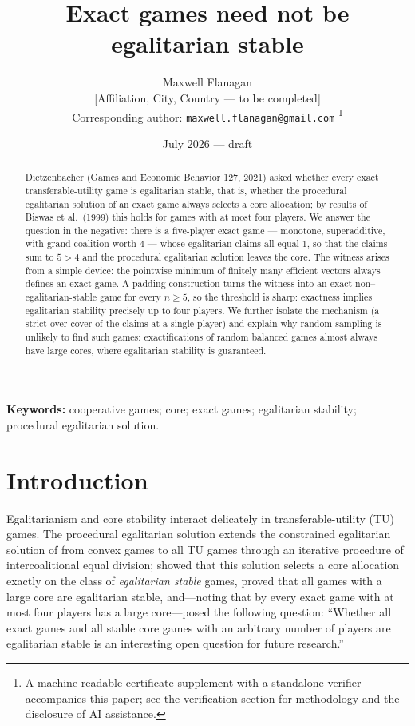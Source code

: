 \documentclass[11pt]{article}
\title{Exact games need not be egalitarian stable}
\author{Maxwell Flanagan\\[2pt]
\normalsize [Affiliation, City, Country --- to be completed]\\
\normalsize Corresponding author: \texttt{maxwell.flanagan@gmail.com}%
\thanks{A machine-readable certificate supplement with a standalone verifier
accompanies this paper; see the verification section for methodology and the
disclosure of AI assistance.}}
\date{July 2026 --- draft}
\begin{document}
\maketitle

\begin{abstract}
Dietzenbacher (Games and Economic Behavior 127, 2021) asked whether every
exact transferable-utility game is egalitarian stable, that is, whether the
procedural egalitarian solution of an exact game always selects a core
allocation; by results of Biswas et al.\ (1999) this holds for games with at
most four players. We answer the question in the negative: there is a
five-player exact game --- monotone, superadditive, with grand-coalition
worth $4$ --- whose egalitarian claims all equal $1$, so that the claims sum
to $5>4$ and the procedural egalitarian solution leaves the core. The
witness arises from a simple device: the pointwise minimum of finitely many
efficient vectors always defines an exact game. A padding construction turns
the witness into an exact non--egalitarian-stable game for every $n\ge 5$,
so the threshold is sharp: exactness implies egalitarian stability precisely
up to four players. We further isolate the mechanism (a strict over-cover of
the claims at a single player) and explain why random sampling is unlikely
to find such games: exactifications of random balanced games almost always
have large cores, where egalitarian stability is guaranteed.
\end{abstract}

\medskip
\noindent\textbf{Keywords:} cooperative games; core; exact games;
egalitarian stability; procedural egalitarian solution.

\section{Introduction}\label{sec:intro}

Egalitarianism and core stability interact delicately in
transferable-utility (TU) games. The procedural egalitarian solution
\citep{DBH2017} extends the constrained egalitarian solution of
\citet{DuttaRay89} from convex games to all TU games through an iterative
procedure of intercoalitional equal division; \citet{Dietzenbacher2021}
showed that this solution selects a core allocation exactly on the class of
\emph{egalitarian stable} games, proved that all games with a large core
\citep{Sharkey1982} are egalitarian stable, and---noting that by
\citet{Biswas1999} every exact game \citep{Schmeidler1972} with at most four
players has a large core---posed the following question: ``Whether all exact
games and all stable core games with an arbitrary number of players are
egalitarian stable is an interesting open question for future research.''
\end{document}
